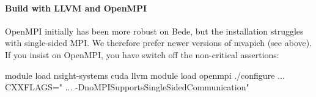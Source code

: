  

  

\paragraph{Build with LLVM and OpenMPI}

OpenMPI initially has been more robust on Bede, but the installation struggles
with single-sided MPI. 
We therefore prefer newer versions of mvapich (see above).
If you insist on OpenMPI, you have switch off the non-critical assertions:

\begin{code}
module load nsight-systems cuda llvm
module load openmpi
./configure ... CXXFLAGS=" ... -DnoMPISupportsSingleSidedCommunication"
\end{code}





% 
% 



